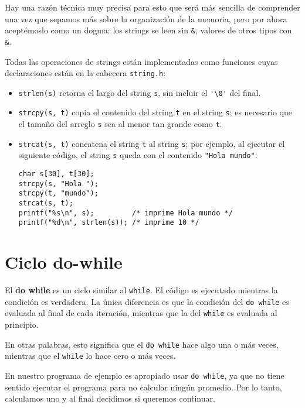 Hay una razón técnica muy precisa para esto que será más sencilla de
comprender una vez que sepamos más sobre la organización de la memoria,
pero por ahora aceptémoslo como un dogma: los strings se leen sin
\lstinline!&!, valores de otros tipos con \lstinline!&!.

Todas las operaciones de strings están implementadas como funciones
cuyas declaraciones están en la cabecera \lstinline!string.h!:

\begin{itemize}
\item
  \lstinline!strlen(s)! retorna el largo del string \lstinline!s!, sin
  incluir el \lstinline!'\0'! del final.
\item
  \lstinline!strcpy(s, t)! copia el contenido del string \lstinline!t!
  en el string \lstinline!s!; es necesario que el tamaño del arreglo
  \lstinline!s! sea al menor tan grande como \lstinline!t!.
\item
  \lstinline!strcat(s, t)! concatena el string \lstinline!t! al string
  \lstinline!s!; por ejemplo, al ejecutar el siguiente código, el string
  \lstinline!s! queda con el contenido \lstinline!"Hola mundo"!:

\begin{lstlisting}
char s[30], t[30];
strcpy(s, "Hola ");
strcpy(t, "mundo");
strcat(s, t);
printf("%s\n", s);         /* imprime Hola mundo */
printf("%d\n", strlen(s)); /* imprime 10 */
\end{lstlisting}
\end{itemize}

\section{Ciclo do-while}

El \textbf{do while} es un ciclo similar al \lstinline!while!. El código
es ejecutado mientras la condición es verdadera. La única diferencia es
que la condición del \lstinline!do while! es evaluada al final de cada
iteración, mientras que la del \lstinline!while! es evaluada al
principio.

En otras palabras, esto significa que el \lstinline!do while! hace algo
una o más veces, mientras que el \lstinline!while! lo hace cero o más
veces.

En nuestro programa de ejemplo es apropiado usar \lstinline!do while!,
ya que no tiene sentido ejecutar el programa para no calcular ningún
promedio. Por lo tanto, calculamos uno y al final decidimos si queremos
continuar.

